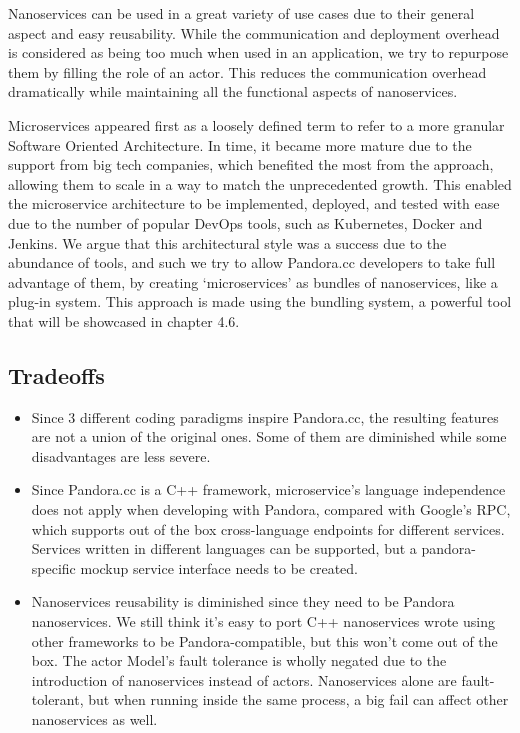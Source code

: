 Nanoservices can be used in a great variety of use cases due to their general aspect and easy reusability. While the communication and deployment overhead is considered as being too much when used in an application, we try to repurpose them by filling the role of an actor. This reduces the communication overhead dramatically while maintaining all the functional aspects of nanoservices.

Microservices appeared first as a loosely defined term to refer to a more granular Software Oriented Architecture. In time, it became more mature due to the support from big tech companies, which benefited the most from the approach, allowing them to scale in a way to match the unprecedented growth. This enabled the microservice architecture to be implemented, deployed, and tested with ease due to the number of popular DevOps tools, such as Kubernetes, Docker and Jenkins. We argue that this architectural style was a success due to the abundance of tools, and such we try to allow Pandora.cc developers to take full advantage of them, by creating ‘microservices’ as bundles of nanoservices, like a plug-in system. This approach is made using the bundling system, a powerful tool that will be showcased in chapter 4.6.

\subsection*{Tradeoffs}
\begin{itemize}
\item Since 3 different coding paradigms inspire Pandora.cc, the resulting features are not a union of the original ones. Some of them are diminished while some disadvantages are less severe.
\item Since Pandora.cc is a C++ framework, microservice’s language independence does not apply when developing with Pandora, compared with Google’s RPC, which supports out of the box cross-language endpoints for different services. Services written in different languages can be supported, but a pandora-specific mockup service interface needs to be created.
\item Nanoservices reusability is diminished since they need to be Pandora nanoservices. We still think it’s easy to port C++ nanoservices wrote using other frameworks to be Pandora-compatible, but this won’t come out of the box. The actor Model’s fault tolerance is wholly negated due to the introduction of nanoservices instead of actors. Nanoservices alone are fault-tolerant, but when running inside the same process, a big fail can affect other nanoservices as well.
\end{itemize}

